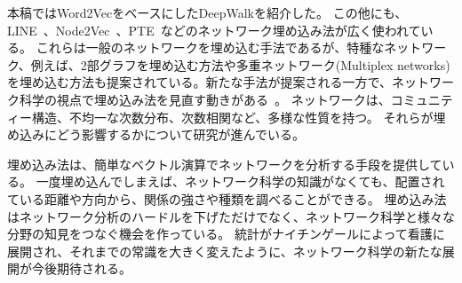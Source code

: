 \documentclass[12pt]{jarticle}
\begin{document}
本稿ではWord2VecをベースにしたDeepWalkを紹介した。
この他にも、LINE~\cite{Tang2015}、Node2Vec~\cite{Grover2016}、PTE~\cite{Tang2015a}などのネットワーク埋め込み法が広く使われている。 
これらは一般のネットワークを埋め込む手法であるが、特種なネットワーク、例えば、2部グラフを埋め込む方法\cite{Gao2018}や多重ネットワーク(Multiplex networks)を埋め込む方法\cite{Dong2017}も提案されている。新たな手法が提案される一方で、ネットワーク科学の視点で埋め込み法を見直す動きがある~\cite{Meng2020, Seshadhri2020,Tandon2020}。
ネットワークは、コミュニティー構造、不均一な次数分布、次数相関など、多様な性質を持つ。
それらが埋め込みにどう影響するかについて研究が進んでいる。

埋め込み法は、簡単なベクトル演算でネットワークを分析する手段を提供している。
一度埋め込んでしまえば、ネットワーク科学の知識がなくても、配置されている距離や方向から、関係の強さや種類を調べることができる。
埋め込み法はネットワーク分析のハードルを下げただけでなく、ネットワーク科学と様々な分野の知見をつなぐ機会を作っている。
統計がナイチンゲールによって看護に展開され、それまでの常識を大きく変えたように、ネットワーク科学の新たな展開が今後期待される。
\end{document}

